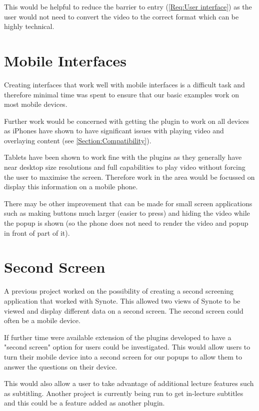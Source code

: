 This would be helpful to reduce the barrier to entry (\cref{Req:User interface}) as the user would not need to convert the video to the correct format which can be highly technical.

\section{Mobile Interfaces}

Creating interfaces that work well with mobile interfaces is a difficult task and therefore minimal time was spent to ensure that our basic examples work on most mobile devices.

Further work would be concerned with getting the plugin to work on all devices as iPhones have shown to have significant issues with playing video and overlaying content (see \autoref{Section:Compatibility}).

Tablets have been shown to work fine with the plugins as they generally have near desktop size resolutions and full capabilities to play video without forcing the user to maximise the screen. Therefore work in the area would be focussed on display this information on a mobile phone.

There may be other improvement that can be made for small screen applications such as making buttons much larger (easier to press) and hiding the video while the popup is shown (so the phone does not need to render the video and popup in front of part of it).

\section{Second Screen}

A previous project  worked on the possibility of creating a second screening application that worked with Synote. This allowed two views of Synote to be viewed and display different data on a second screen. The second screen could often be a mobile device.

If further time were available extension of the plugins developed to have a "second screen" option for users could be investigated. This would allow users to turn their mobile device into a second screen for our popups to allow them to answer the questions on their device.

This would also allow a user to take advantage of additional lecture features such as subtitling. Another project is currently being run to get in-lecture subtitles and this could be a feature added as another plugin.

